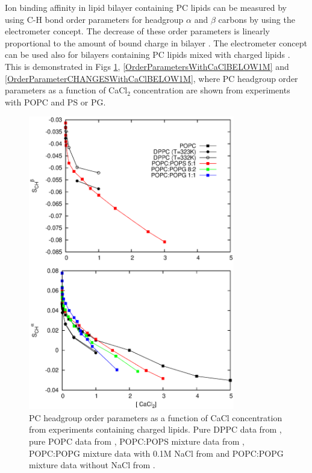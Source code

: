 \documentclass[aps,prl,superscriptaddress,twocolumn]{revtex4}
\begin{document}
Ion binding affinity in lipid bilayer containing PC lipids can be 
measured by using C-H bond order parameters for headgroup $\alpha$ and
$\beta$ carbons by using the electrometer concept. The decrease of these 
order parameters is linearly proportional to the amount of bound charge 
in bilayer \cite{??,catte16}. The electrometer concept can be used also
for bilayers containing PC lipids mixed with charged lipids \cite{macdonald87,roux90,??}.
This is demonstrated in Figs \ref{OrderParametersWithCaCl},
\ref{OrderParametersWithCaClBELOW1M} and \ref{OrderParameterCHANGESWithCaClBELOW1M}, where PC headgroup order parameters 
as a function of CaCl$_2$ concentration are shown from experiments with POPC and PS or PG.
\begin{figure}[]
  \centering
  \includegraphics[width=9.0cm]{../Figs/LIPIDSwithCaCl.eps}
  \caption{\label{OrderParametersWithCaCl}
    PC headgroup order parameters as a function of CaCl concentration from experiments containing charged lipids.
    Pure DPPC data from \cite{akutsu81}, pure POPC data from \cite{altenbach84}, 
    POPC:POPS mixture data from \cite{roux90}, POPC:POPG mixture data with 0.1M NaCl from \cite{macdonald87}
    and POPC:POPG mixture data without NaCl from \cite{borle85}.
  }
\end{figure}
\end{document}
